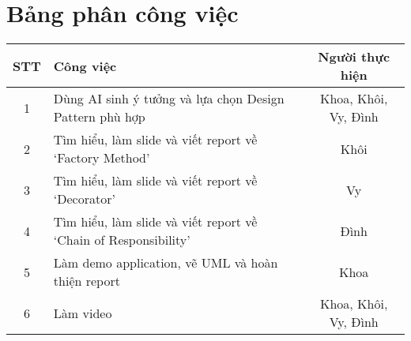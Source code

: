 \section{Bảng phân công việc}
\begin{center}
  \renewcommand{\arraystretch}{1.5}
  \begin{tabular}{|c|p{}|c|}
    \hline
    \textbf{STT} & \textbf{Công việc}                                              & \textbf{Người thực hiện} \\\hline
    1            & Dùng AI sinh ý tưởng và lựa chọn Design Pattern phù hợp         & Khoa, Khôi, Vy, Đình     \\\hline
    2            & Tìm hiểu, làm slide và viết report về `Factory Method'          & Khôi                     \\\hline
    3            & Tìm hiểu, làm slide và viết report về `Decorator'               & Vy                       \\\hline
    4            & Tìm hiểu, làm slide và viết report về `Chain of Responsibility' & Đình                     \\\hline
    5            & Làm demo application, vẽ UML và hoàn thiện report               & Khoa                     \\\hline
    6            & Làm video                                                       & Khoa, Khôi, Vy, Đình     \\\hline
  \end{tabular}
\end{center}
